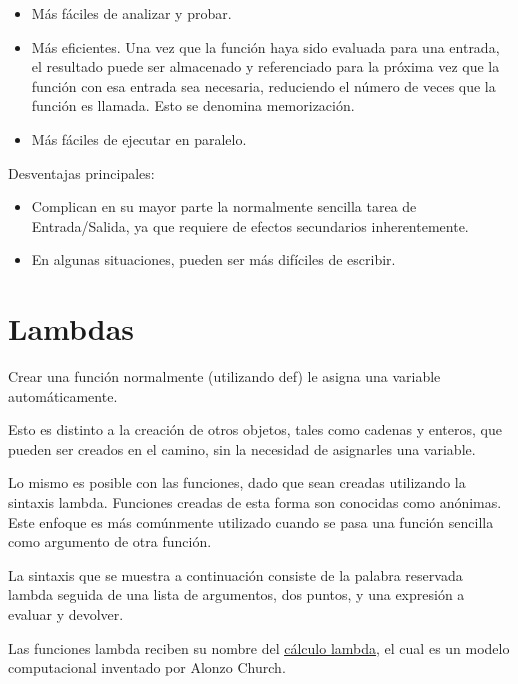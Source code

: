 \documentclass{report}
\newcommand{\link}[2]{\href{#1}{\underline{#2}}}
\begin{document}
\begin{itemize}
  \item Más fáciles de analizar y probar.
  
  \item Más eficientes. Una vez que la función haya sido evaluada para una entrada, el resultado puede ser almacenado y referenciado para la próxima vez que la función con esa entrada sea necesaria, reduciendo el número de veces que la función es llamada. Esto se denomina memorización.
  
  \item Más fáciles de ejecutar en paralelo.
  
\end{itemize}

Desventajas principales:

\begin{itemize}
  \item Complican en su mayor parte la normalmente sencilla tarea de Entrada/Salida, ya que requiere de efectos secundarios inherentemente.
  
  \item En algunas situaciones, pueden ser más difíciles de escribir.
  
\end{itemize}

\section{Lambdas}

Crear una función normalmente (utilizando def) le asigna una variable automáticamente.\smallskip

Esto es distinto a la creación de otros objetos, tales como cadenas y enteros, que pueden ser creados en el camino, sin la necesidad de asignarles una variable.\smallskip

Lo mismo es posible con las funciones, dado que sean creadas utilizando la sintaxis lambda. Funciones creadas de esta forma son conocidas como anónimas.
Este enfoque es más comúnmente utilizado cuando se pasa una función sencilla como argumento de otra función.\smallskip

La sintaxis que se muestra a continuación consiste de la palabra reservada lambda seguida de una lista de argumentos, dos puntos, y una expresión a evaluar y devolver.


Las funciones lambda reciben su nombre del \link{https://es.wikipedia.org/wiki/C\%C3\%A1lculo_lambda}{cálculo lambda}, el cual es un modelo computacional inventado por Alonzo Church.\smallskip
\end{document}
